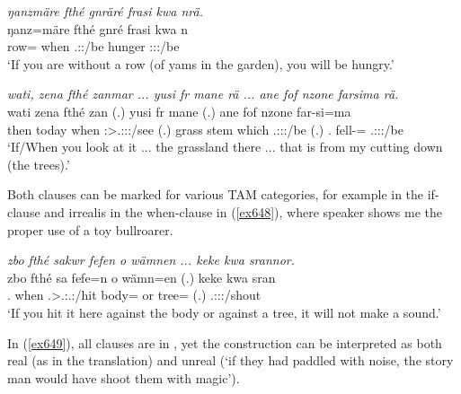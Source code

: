 \begin{exe}
	\ex \emph{ŋanzmäre fthé gnräré frasi kwa nrä.}\\
	\gll ŋanz=märe fthé gnré frasi kwa n\\
	row=\Priv{} when \Ssg.\Sbj:\Imp:\Ipfv/be hunger \Fut{} \Ssg:\Sbj:\Nonpast:\Ipfv/be\\
	\trans `If you are without a row (of yams in the garden), you will be hungry.'\\
	\label{ex646}
\end{exe}
\begin{exe}
	\ex \emph{wati, zena fthé zanmar ... yusi fr mane rä ... ane fof nzone farsima rä.}\\
	\gll wati zena fthé zan (.) yusi fr mane  (.) ane fof nzone far-si=ma \\
	then today when \Ssg:\Sbj>\Tsg.\F:\Obj:\Imp:\Pfv/see (.) grass stem which \Tsg.\F:\Sbj:\Nonpast:\Ipfv/be (.) \Dem{} \Emph{} \Fsg.\Poss{} fell-\Nmlz=\Char{} \Tsg.\F:\Sbj:\Nonpast:\Ipfv/be\\
	\trans `If/When you look at it ... the grassland there ... that is from my cutting down (the trees).'
	\label{ex647}
\end{exe}

Both clauses can be marked for various TAM categories, for example  in the if-clause and irrealis in the when-clause in (\ref{ex648}), where speaker shows me the proper use of a toy bullroarer.

\begin{exe}
	\ex \emph{zbo fthé sakwr fefen o wämnen ... keke kwa srannor.}\\
	\gll zbo fthé sa fefe=n o wämn=en (.) keke kwa sran\\
	\Prox.\All{} when \Ssg.\Sbj>\Tsg.\Masc:\Obj.\Imp:\Pfv/hit body=\Loc{} or tree=\Loc{} (.) \Neg{} \Fut{} \Tsg.\Masc:\Sbj:\Irr:\Ipfv/shout\\
	\trans `If you hit it here against the body or against a tree, it will not make a sound.'
	\label{ex648}
\end{exe}

In (\ref{ex649}), all clauses are in  , yet the  construction can be interpreted as both real (as in the translation) and unreal (`if they had paddled with noise, the story man would have shoot them with magic').

